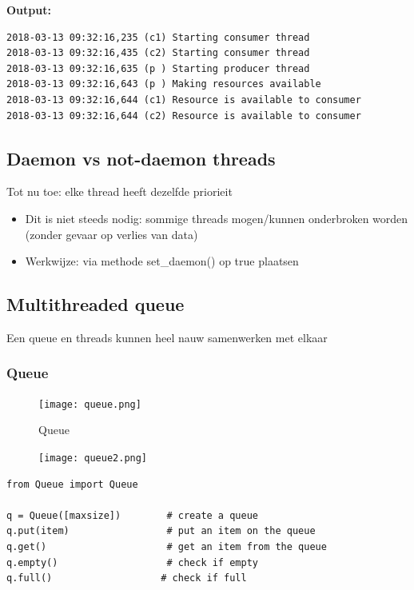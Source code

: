 \documentclass{article}
\begin{document}
\textbf{Output:}

\begin{verbatim}
2018-03-13 09:32:16,235 (c1) Starting consumer thread
2018-03-13 09:32:16,435 (c2) Starting consumer thread
2018-03-13 09:32:16,635 (p ) Starting producer thread
2018-03-13 09:32:16,643 (p ) Making resources available
2018-03-13 09:32:16,644 (c1) Resource is available to consumer
2018-03-13 09:32:16,644 (c2) Resource is available to consumer

\end{verbatim}

\subsection{Daemon vs not-daemon threads}

Tot nu toe: elke thread heeft dezelfde priorieit

\begin{itemize}
    \item Dit is niet steeds nodig: sommige threads mogen/kunnen onderbroken worden (zonder gevaar op verlies van data)
    \item Werkwijze: via methode set\_daemon() op true plaatsen
\end{itemize}

\subsection{Multithreaded queue}

Een queue en threads kunnen heel nauw samenwerken met elkaar

\subsubsection{Queue}

\begin{figure}[H]
    \centering
    \texttt{[image: queue.png]}
    \caption{Queue}
\end{figure}

\begin{figure}[H]
    \centering
    \texttt{[image: queue2.png]}
\end{figure}



\begin{verbatim}
from Queue import Queue

q = Queue([maxsize])        # create a queue
q.put(item)                 # put an item on the queue
q.get()                     # get an item from the queue
q.empty()                   # check if empty
q.full()                   # check if full
\end{verbatim}
\end{document}
